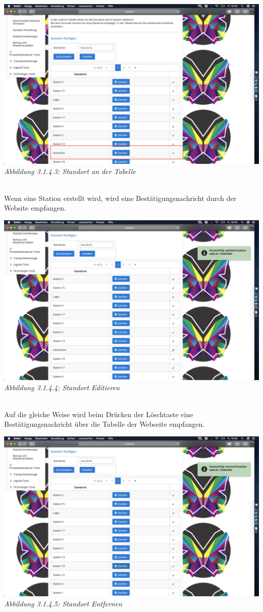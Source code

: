 \documentclass[enabledeprecatedfontcommands,fontsize=12pt,paper=a4,twoside]{scrartcl}
\begin{document}
\hypertarget{sc3.1.4.3}{
\includegraphics[width=1\textwidth]{Screenshots/4TestExperimentierteEstacion.png}
\textit{Abbildung 3.1.4.3: Standort an der Tabelle}
} \\
Wenn eine Station erstellt wird, wird eine Bestätigungsnachricht durch der Website empfangen.

\hypertarget{sc3.1.4.4}{
\includegraphics[width=1\textwidth]{Screenshots/4UpdateStantion.png}
\textit{Abbildung 3.1.4.4:  Standort Editieren}
} \\
Auf die gleiche Weise wird beim Drücken der Löschtaste eine Bestätigungsnachricht über die Tabelle der Webseite empfangen.

\hypertarget{sc3.1.4.5}{
\includegraphics[width=1\textwidth]{Screenshots/4RemoveStation.png}
\textit{Abbildung 3.1.4.5: Standort Entfernen}
} \\
\end{document}
